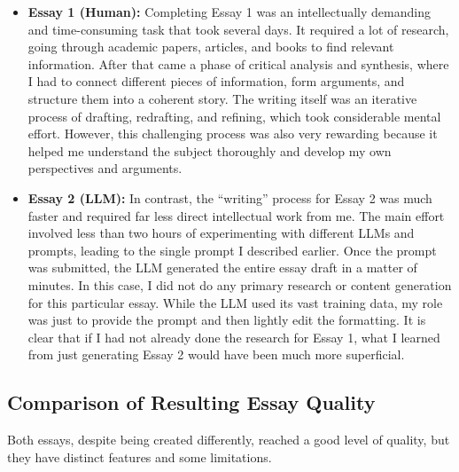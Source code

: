 \documentclass[11pt,a4paper]{article}
\begin{document}
\begin{itemize}
    \item \textbf{Essay 1 (Human):} Completing Essay 1 was an intellectually demanding and time-consuming task that took several days. It required a lot of research, going through academic papers, articles, and books to find relevant information. After that came a phase of critical analysis and synthesis, where I had to connect different pieces of information, form arguments, and structure them into a coherent story. The writing itself was an iterative process of drafting, redrafting, and refining, which took considerable mental effort. However, this challenging process was also very rewarding because it helped me understand the subject thoroughly and develop my own perspectives and arguments.

    \item \textbf{Essay 2 (LLM):} In contrast, the ``writing'' process for Essay 2 was much faster and required far less direct intellectual work from me. The main effort involved less than two hours of experimenting with different LLMs and prompts, leading to the single prompt I described earlier. Once the prompt was submitted, the LLM generated the entire essay draft in a matter of minutes. In this case, I did not do any primary research or content generation for this particular essay. While the LLM used its vast training data, my role was just to provide the prompt and then lightly edit the formatting. It is clear that if I had not already done the research for Essay 1, what I learned from just generating Essay 2 would have been much more superficial.
\end{itemize}

\subsection{Comparison of Resulting Essay Quality}

Both essays, despite being created differently, reached a good level of quality, but they have distinct features and some limitations.
\end{document}
